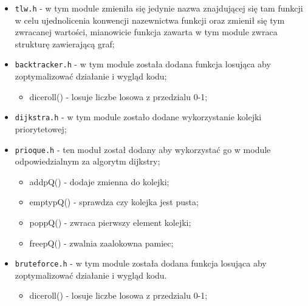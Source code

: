 \documentclass[]{article}
\begin{document}
\begin{itemize}
\item
\texttt{tlw.h} - w tym module zmieniła się jedynie nazwa znajdującej się tam funkcji w celu ujednolicenia konwencji nazewnictwa funkcji oraz zmienił się tym zwracanej wartości, mianowicie funkcja zawarta w tym module zwraca strukturę zawierającą graf;
\item
\texttt{backtracker.h} - w tym module została dodana funkcja losująca aby zoptymalizować działanie i wygląd kodu;
\begin{itemize}
\item
diceroll() - losuje liczbe losowa z przedzialu 0-1;
\end{itemize}
\item
\texttt{dijkstra.h} - w tym module zostało dodane wykorzystanie kolejki priorytetowej;
\item
\texttt{prioque.h} - ten moduł został dodany aby wykorzystać go w module odpowiedzialnym za algorytm dijkstry;
\begin{itemize}
\item
addpQ() - dodaje zmienna do kolejki;
\item
emptypQ() - sprawdza czy kolejka jest pusta;
\item
poppQ() - zwraca pierwszy element kolejki;
\item
freepQ() - zwalnia zaalokowna pamiec;
\end{itemize}
\item
\texttt{bruteforce.h} - w tym module została dodana funkcja losująca aby zoptymalizować działanie i wygląd kodu.
\begin{itemize}
\item
diceroll() - losuje liczbe losowa z przedzialu 0-1;
\end{itemize}
\end{itemize}
\end{document}

